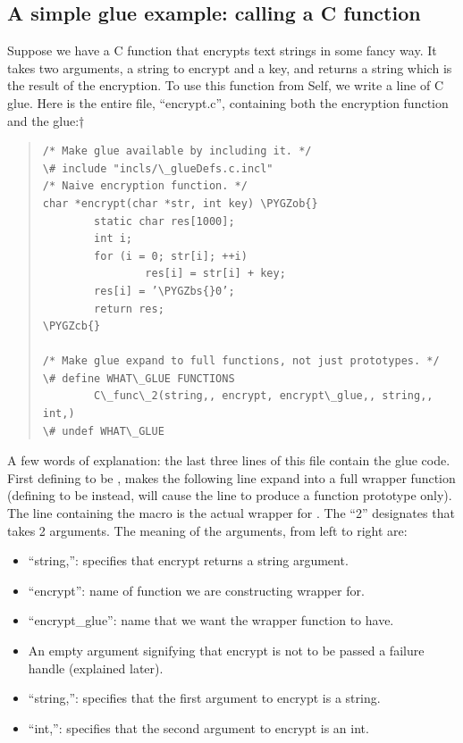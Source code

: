 \documentclass[letterpaper,10pt,english]{sphinxmanual}
\def\PYGZbs{\char`\\}
\def\PYGZob{\char`\{}
\def\PYGZcb{\char`\}}
\begin{document}

\subsection{A simple glue example: calling a C function}
\label{vmref:index-66}\label{vmref:a-simple-glue-example-calling-a-c-function}
Suppose we have a C function that encrypts text strings in some fancy way. It takes two arguments,
a string to encrypt and a key, and returns a string which is the result of the encryption. To use this
function from Self, we write a line of C glue. Here is the entire file, “encrypt.c”, containing both
the encryption function and the glue:†
\begin{quote}

\begin{Verbatim}[commandchars=\\\{\}]
/* Make glue available by including it. */
\# include "incls/\_glueDefs.c.incl"
/* Naive encryption function. */
char *encrypt(char *str, int key) \PYGZob{}
        static char res[1000];
        int i;
        for (i = 0; str[i]; ++i)
                res[i] = str[i] + key;
        res[i] = ’\PYGZbs{}0’;
        return res;
\PYGZcb{}

/* Make glue expand to full functions, not just prototypes. */
\# define WHAT\_GLUE FUNCTIONS
        C\_func\_2(string,, encrypt, encrypt\_glue,, string,, int,)
\# undef WHAT\_GLUE
\end{Verbatim}
\end{quote}

A few words of explanation: the last three lines of this file contain the glue code. First defining
 to be , makes the following line expand into a full wrapper function (defining
 to be  instead, will cause the  line to produce a function
prototype only). The line containing the macro  is the actual wrapper for .
The “2” designates that  takes 2 arguments. The meaning of the arguments, from left to
right are:
\begin{itemize}
\item {} 
“string,”: specifies that encrypt returns a string argument.

\item {} 
“encrypt”: name of function we are constructing wrapper for.

\item {} 
“encrypt\_glue”: name that we want the wrapper function to have.

\item {} 
An empty argument signifying that encrypt is not to be passed a failure handle (explained later).

\item {} 
“string,”: specifies that the first argument to encrypt is a string.

\item {} 
“int,”: specifies that the second argument to encrypt is an int.

\end{itemize}
\end{document}

